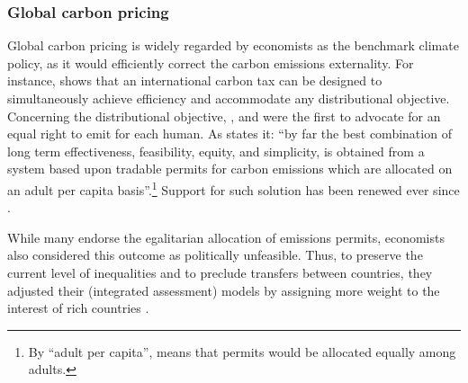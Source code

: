 \subsubsection{Global carbon pricing}\label{subsubsec:literature_pricing}

Global carbon pricing is widely regarded by economists as the benchmark climate policy, as it would efficiently correct the carbon emissions externality. For instance, \citet{hoel_carbon_1991} shows that an international carbon tax can be designed to simultaneously achieve efficiency and accommodate any distributional objective. 
Concerning the distributional objective, \citet{grubb_greenhouse_1990}, \citet{agarwal_global_1991} and \citet{bertram_tradeable_1992} were the first to advocate for an equal right to emit for each human. As \citet{grubb_greenhouse_1990} states it: ``by far the best combination of long term effectiveness, feasibility, equity, and simplicity, is obtained from a system based upon tradable permits for carbon emissions which are allocated on an adult per capita basis''.\footnote{By ``adult per capita'', \citet{grubb_greenhouse_1990} means that permits would be allocated equally among adults.} Support for such solution has been renewed ever since \citep{baer_equity_2000,jamieson_climate_2001,blanchard_major_2021,rajan_global_2021}. %

While many endorse the egalitarian allocation of emissions permits, economists also considered this outcome as politically unfeasible. Thus, to preserve the current level of inequalities and to preclude transfers between countries, they adjusted their (integrated assessment) models by assigning more weight to the interest of rich countries \citep{stanton_negishi_2011}.  %

